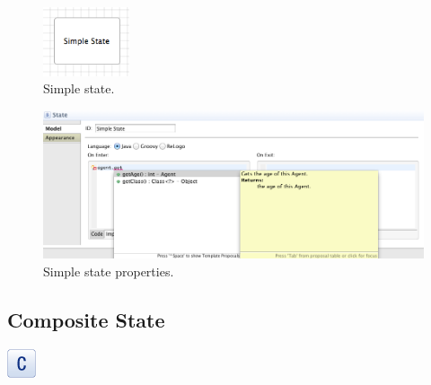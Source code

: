 \documentclass[11pt]{amsart}
\begin{document}
\begin{figure}
\begin{center}
\vspace{.2in}
\centerline {
\includegraphics[width=1in]{StatechartsImages/SimpleState.png}
}
\caption{Simple state.}
\label{fig:simpleState}
\end{center}
\end{figure}

\begin{figure}
\begin{center}
\vspace{.2in}
\centerline {
\includegraphics[width=5in]{StatechartsImages/SimpleStateProperties.png}
}
\caption{Simple state properties.}
\label{fig:simpleStateProperties}
\end{center}
\end{figure}

\clearpage

\subsection{Composite State}
\label{sec:compositeState}
\includegraphics[height=.2in]{StatechartsImages/Composite-State-32.png}
\end{document}
